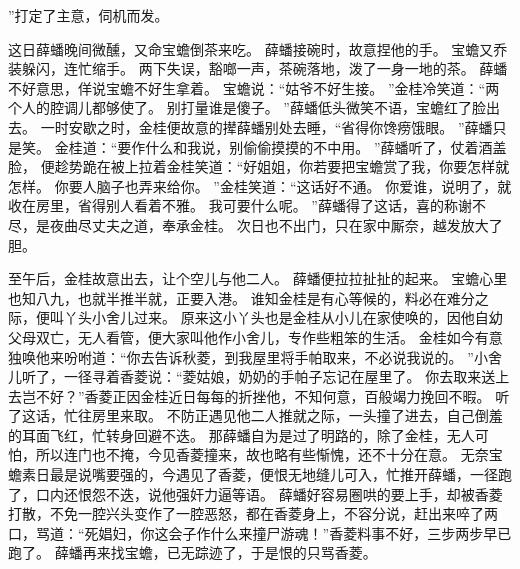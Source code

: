 ”打定了主意，伺机而发。
\par
这日薛蟠晚间微醺，又命宝蟾倒茶来吃。
薛蟠接碗时，故意捏他的手。
宝蟾又乔装躲闪，连忙缩手。
两下失误，豁啷一声，茶碗落地，泼了一身一地的茶。
薛蟠不好意思，佯说宝蟾不好生拿着。
宝蟾说：“姑爷不好生接。
”金桂冷笑道：“两个人的腔调儿都够使了。
别打量谁是傻子。
”薛蟠低头微笑不语，宝蟾红了脸出去。
一时安歇之时，金桂便故意的撵薛蟠别处去睡，“省得你馋痨饿眼。
”薛蟠只是笑。
金桂道：“要作什么和我说，别偷偷摸摸的不中用。
”薛蟠听了，仗着酒盖脸，
便趁势跪在被上拉着金桂笑道：“好姐姐，你若要把宝蟾赏了我，你要怎样就怎样。
你要人脑子也弄来给你。
”金桂笑道：“这话好不通。
你爱谁，说明了，就收在房里，省得别人看着不雅。
我可要什么呢。
”薛蟠得了这话，喜的称谢不尽，是夜曲尽丈夫之道，奉承金桂。
次日也不出门，只在家中厮奈，越发放大了胆。
\par
至午后，金桂故意出去，让个空儿与他二人。
薛蟠便拉拉扯扯的起来。
宝蟾心里也知八九，也就半推半就，正要入港。
谁知金桂是有心等候的，料必在难分之际，便叫丫头小舍儿过来。
原来这小丫头也是金桂从小儿在家使唤的，因他自幼父母双亡，无人看管，便大家叫他作小舍儿，专作些粗笨的生活。
金桂如今有意独唤他来吩咐道：“你去告诉秋菱，到我屋里将手帕取来，不必说我说的。
”小舍儿听了，一径寻着香菱说：“菱姑娘，奶奶的手帕子忘记在屋里了。
你去取来送上去岂不好？”香菱正因金桂近日每每的折挫他，不知何意，百般竭力挽回不暇。
听了这话，忙往房里来取。
不防正遇见他二人推就之际，一头撞了进去，自己倒羞的耳面飞红，忙转身回避不迭。
那薛蟠自为是过了明路的，除了金桂，无人可怕，所以连门也不掩，今见香菱撞来，故也略有些惭愧，还不十分在意。
无奈宝蟾素日最是说嘴要强的，今遇见了香菱，便恨无地缝儿可入，忙推开薛蟠，一径跑了，口内还恨怨不迭，说他强奸力逼等语。
薛蟠好容易圈哄的要上手，却被香菱打散，不免一腔兴头变作了一腔恶怒，都在香菱身上，不容分说，赶出来啐了两口，骂道：“死娼妇，你这会子作什么来撞尸游魂！”香菱料事不好，三步两步早已跑了。
薛蟠再来找宝蟾，已无踪迹了，于是恨的只骂香菱。
\par
